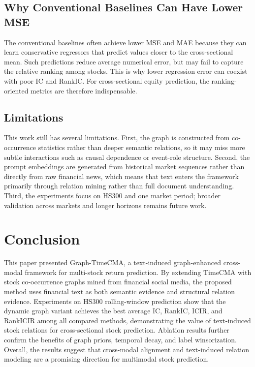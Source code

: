 \documentclass[11pt]{article}
\begin{document}
\subsection{Why Conventional Baselines Can Have Lower MSE}

The conventional baselines often achieve lower MSE and MAE because they can learn conservative regressors that predict values closer to the cross-sectional mean. Such predictions reduce average numerical error, but may fail to capture the relative ranking among stocks. This is why lower regression error can coexist with poor IC and RankIC. For cross-sectional equity prediction, the ranking-oriented metrics are therefore indispensable.

\subsection{Limitations}

This work still has several limitations. First, the graph is constructed from co-occurrence statistics rather than deeper semantic relations, so it may miss more subtle interactions such as causal dependence or event-role structure. Second, the prompt embeddings are generated from historical market sequences rather than directly from raw financial news, which means that text enters the framework primarily through relation mining rather than full document understanding. Third, the experiments focus on HS300 and one market period; broader validation across markets and longer horizons remains future work.

\section{Conclusion}

This paper presented Graph-TimeCMA, a text-induced graph-enhanced cross-modal framework for multi-stock return prediction. By extending TimeCMA with stock co-occurrence graphs mined from financial social media, the proposed method uses financial text as both semantic evidence and structural relation evidence. Experiments on HS300 rolling-window prediction show that the dynamic graph variant achieves the best average IC, RankIC, ICIR, and RankICIR among all compared methods, demonstrating the value of text-induced stock relations for cross-sectional stock prediction. Ablation results further confirm the benefits of graph priors, temporal decay, and label winsorization. Overall, the results suggest that cross-modal alignment and text-induced relation modeling are a promising direction for multimodal stock prediction.


\end{document}
